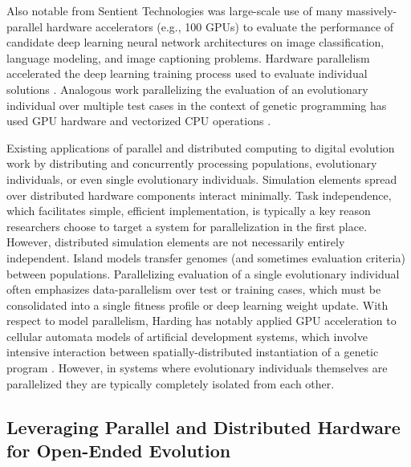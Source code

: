 Also notable from Sentient Technologies was large-scale use of many massively-parallel hardware accelerators (e.g., 100 GPUs) to evaluate the performance of candidate deep learning neural network architectures on image classification, language modeling, and image captioning problems.
Hardware parallelism accelerated the deep learning training process used to evaluate individual solutions \citep{miikkulainen2019evolving}.
Analogous work parallelizing the evaluation of an evolutionary individual over multiple test cases in the context of genetic programming has used GPU hardware and vectorized CPU operations \citep{harding2007fast2, langdon2019continuous}.


Existing applications of parallel and distributed computing to digital evolution work by distributing and concurrently processing populations, evolutionary individuals, or even single evolutionary individuals.
Simulation elements spread over distributed hardware components interact minimally.
Task independence, which facilitates simple, efficient implementation, is typically a key reason researchers choose to target a system for parallelization in the first place. %
However, distributed simulation elements are not necessarily entirely independent.
Island models transfer genomes (and sometimes evaluation criteria) between populations.
Parallelizing evaluation of a single evolutionary individual often emphasizes data-parallelism over test or training cases, which must be consolidated into a single fitness profile or deep learning weight update. %
With respect to model parallelism, Harding has notably applied GPU acceleration to cellular automata models of artificial development systems, which involve intensive interaction between spatially-distributed instantiation of a genetic program  \citep{harding2007fast}.
However, in systems where evolutionary individuals themselves are parallelized they are typically completely isolated from each other.

\subsection{Leveraging Parallel and Distributed Hardware for Open-Ended Evolution}



